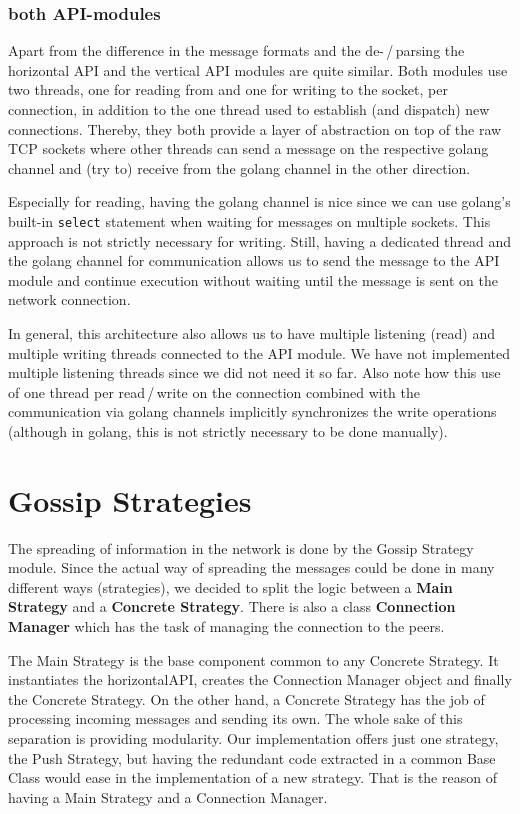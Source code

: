 \documentclass[a4paper,english,10pt,NET]{tumarticle}
\begin{document}
\subsubsection{both API-modules}
Apart from the difference in the message formats and the de-\,/\,parsing the horizontal API and the vertical API modules are quite similar.
Both modules use two threads, one for reading from and one for writing to the socket, per connection, in addition to the one thread used to establish (and dispatch) new connections.
Thereby, they both provide a layer of abstraction on top of the raw TCP sockets where other threads can send a message on the respective golang channel and (try to) receive from the golang channel in the other direction.

Especially for reading, having the golang channel is nice since we can use golang's built-in \texttt{select} statement when waiting for messages on multiple sockets.
This approach is not strictly necessary for writing.
Still, having a dedicated thread and the golang channel for communication allows us to send the message to the API module and continue execution without waiting until the message is sent on the network connection.

In general, this architecture also allows us to have multiple listening (read) and multiple writing threads connected to the API module.
We have not implemented multiple listening threads since we did not need it so far.
Also note how this use of one thread per read\,/\,write on the connection combined with the communication via golang channels implicitly synchronizes the write operations (although in golang, this is not strictly necessary to be done manually).


\section{Gossip Strategies}

The spreading of information in the network is done by the Gossip Strategy module. Since the actual way of spreading the messages could be done in many different ways (strategies), we decided to split the logic between a \textbf{Main Strategy} and a \textbf{Concrete Strategy}. There is also a class \textbf{Connection Manager} which has the task of managing the connection to the peers. 

The Main Strategy is the base component common to any Concrete Strategy. It instantiates the horizontalAPI, creates the Connection Manager object and finally the Concrete Strategy. On the other hand, a Concrete Strategy  has the job of processing incoming messages and sending its own. The whole sake of this separation is providing modularity. Our implementation offers just one strategy, the Push Strategy, but having the redundant code extracted in a common Base Class would ease in the implementation of a new strategy. That is the reason of having a Main Strategy and a Connection Manager.
\end{document}
